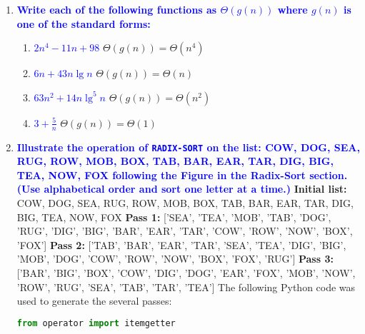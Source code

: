\documentclass{article}
\begin{document}
\begin{enumerate}
\item \textbf{\textcolor{blue}{Write each of the following functions as $\Theta(g(n))$ where
$g(n)$ is one of the standard forms:}}
    \begin{enumerate}
    \item \textbf{\textcolor{blue}{$2n^4-11n+98$}}
        \newline\newline $\Theta(g(n)) = \Theta(n^4)$
    \item \textbf{\textcolor{blue}{$6n + 43n\lg n$}}
        \newline\newline$\Theta(g(n)) = \Theta(n)$\newline
    \item \textbf{\textcolor{blue}{$63n^2 + 14n\lg^5n$}}
        \newline\newline$\Theta(g(n)) = \Theta(n^2)$\newline
    \item \textbf{\textcolor{blue}{$3 + \frac{5}{n}$}}
        \newline\newline$\Theta(g(n)) = \Theta(1)$\newline
    \end{enumerate}

\item \textbf{\textcolor{blue}{Illustrate the operation of {\tt RADIX-SORT} on the
list: COW, DOG, SEA, RUG, ROW, MOB, BOX, TAB, BAR, EAR, TAR, DIG, BIG,
TEA, NOW, FOX following the Figure in the Radix-Sort section.
(Use alphabetical order and sort one letter at a time.)}}
    \newline\newline\textbf{Initial list:} COW, DOG, SEA, RUG, ROW, MOB, BOX, TAB, BAR, EAR, TAR, DIG, BIG, TEA, NOW, FOX
    \newline\textbf{Pass 1:} ['SEA', 'TEA', 'MOB', 'TAB', 'DOG', 'RUG', 'DIG', 'BIG', 'BAR', 'EAR', 'TAR', 'COW', 'ROW', 'NOW', 'BOX', 'FOX']
    \newline\textbf{Pass 2:} ['TAB', 'BAR', 'EAR', 'TAR', 'SEA', 'TEA', 'DIG', 'BIG', 'MOB', 'DOG', 'COW', 'ROW', 'NOW', 'BOX', 'FOX', 'RUG']
    \newline\textbf{Pass 3:} ['BAR', 'BIG', 'BOX', 'COW', 'DIG', 'DOG', 'EAR', 'FOX', 'MOB', 'NOW', 'ROW', 'RUG', 'SEA', 'TAB', 'TAR', 'TEA']
    \newline\newline The following Python code was used to generate the several passes:
    \begin{lstlisting}[language=Python]
    from operator import itemgetter
                 

\end{lstlisting}
\end{enumerate}
\end{document}

